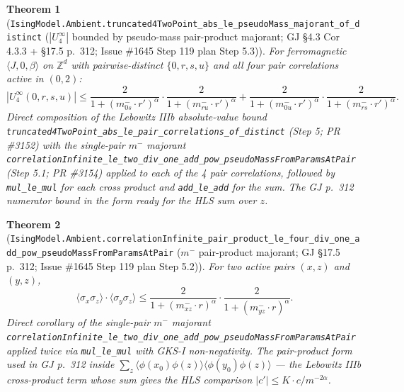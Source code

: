 \documentclass[a4paper,11pt]{article}
\newtheorem{theorem}{Theorem}
\begin{document}
\begin{theorem}[\texttt{IsingModel.Ambient.truncated4TwoPoint\_abs\_le\_pseudoMass\_majorant\_of\_distinct}
($|U_4^\infty|$ bounded by pseudo-mass pair-product majorant; GJ \S4.3 Cor 4.3.3 + \S17.5 p.~312;
Issue \#1645 Step 119 plan Step 5.3)]
For ferromagnetic $\langle J, 0, \beta\rangle$ on $\mathbb{Z}^d$ with pairwise-distinct
$\{0, r, s, u\}$ and all four pair correlations active in $(0, 2)$:
\[
  |U_4^\infty(0, r, s, u)|
    \le \frac{2}{1+(m^-_{0s}\cdot r')^\alpha}\cdot\frac{2}{1+(m^-_{ru}\cdot r')^\alpha}
      + \frac{2}{1+(m^-_{0u}\cdot r')^\alpha}\cdot\frac{2}{1+(m^-_{rs}\cdot r')^\alpha}.
\]
Direct composition of the Lebowitz IIIb absolute-value bound
\texttt{truncated4TwoPoint\_abs\_le\_pair\_correlations\_of\_distinct} (Step 5; PR \#3152) with
the single-pair $m^-$ majorant
\texttt{correlationInfinite\_le\_two\_div\_one\_add\_pow\_pseudoMassFromParamsAtPair} (Step 5.1;
PR \#3154) applied to each of the 4 pair correlations, followed by \texttt{mul\_le\_mul} for
each cross product and \texttt{add\_le\_add} for the sum. The GJ p.~312 numerator bound in
the form ready for the HLS sum over $z$.
\end{theorem}

\begin{theorem}[\texttt{IsingModel.Ambient.correlationInfinite\_pair\_product\_le\_four\_div\_one\_add\_pow\_pseudoMassFromParamsAtPair}
($m^-$ pair-product majorant; GJ \S17.5 p.~312; Issue \#1645 Step 119 plan Step 5.2)]
For two active pairs $(x, z)$ and $(y, z)$,
\[
  \langle\sigma_x\sigma_z\rangle\cdot\langle\sigma_y\sigma_z\rangle
    \le \frac{2}{1+(m^-_{xz}\cdot r)^\alpha}\cdot\frac{2}{1+(m^-_{yz}\cdot r)^\alpha}.
\]
Direct corollary of the single-pair $m^-$ majorant
\texttt{correlationInfinite\_le\_two\_div\_one\_add\_pow\_pseudoMassFromParamsAtPair}
applied twice via \texttt{mul\_le\_mul} with GKS-I non-negativity. The pair-product form
used in GJ p.~312 inside $\sum_z\langle\phi(x_0)\phi(z)\rangle\langle\phi(y_0)\phi(z)\rangle$
— the Lebowitz IIIb cross-product term whose sum gives the HLS comparison
$|c'|\le K\cdot c/m^{-2\alpha}$.
\end{theorem}
\end{document}
